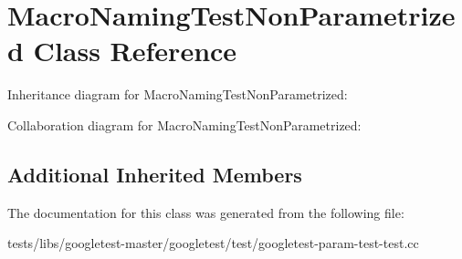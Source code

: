 \hypertarget{classMacroNamingTestNonParametrized}{}\section{Macro\+Naming\+Test\+Non\+Parametrized Class Reference}
\label{classMacroNamingTestNonParametrized}


Inheritance diagram for Macro\+Naming\+Test\+Non\+Parametrized\+:


Collaboration diagram for Macro\+Naming\+Test\+Non\+Parametrized\+:
\subsection*{Additional Inherited Members}


The documentation for this class was generated from the following file\+:\begin{DoxyCompactItemize}
\item 
tests/libs/googletest-\/master/googletest/test/googletest-\/param-\/test-\/test.\+cc\end{DoxyCompactItemize}
